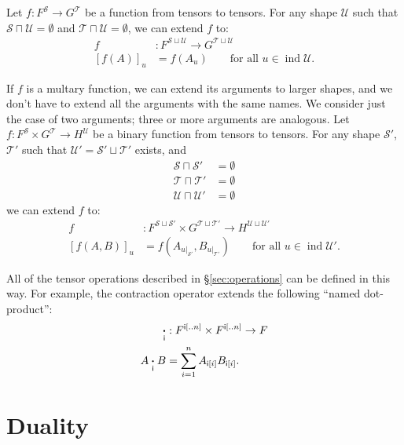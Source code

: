 \documentclass{article}
\DeclareMathOperator{\tupleshape}{ind}
\newcommand{\tuplerestrict}[2]{\left.#1\right|_{#2}}
\begin{document}
Let $f \colon F^{\mathcal{S}} \rightarrow G^{\mathcal{T}}$ be a function from tensors to tensors. For any shape $\mathcal{U}$ such that $\mathcal{S} \sqcap \mathcal{U} = \emptyset$ and $\mathcal{T} \sqcap \mathcal{U} = \emptyset$, we can extend $f$ to:
\begin{align*}
f &: F^{\mathcal{S} \sqcup \mathcal{U}} \rightarrow G^{\mathcal{T} \sqcup \mathcal{U}} \\
[f(A)]_u &= f(A_u) \qquad \text{for all $u \in \tupleshape\mathcal{U}$.}
\end{align*}

If $f$ is a multary function, we can extend its arguments to larger shapes, and we don't have to extend all the arguments with the same names. We consider just the case of two arguments; three or more arguments are analogous. Let $f \colon F^{\mathcal{S}} \times G^{\mathcal{T}} \rightarrow H^{\mathcal{U}}$ be a binary function from tensors to tensors. For any shape $\mathcal{S'}$, $\mathcal{T'}$ such that $\mathcal{U'} = \mathcal{S'} \sqcup \mathcal{T'}$ exists, and 
\begin{align*}
\mathcal{S} \sqcap \mathcal{S'} &= \emptyset \\
\mathcal{T} \sqcap \mathcal{T'} &= \emptyset \\
\mathcal{U} \sqcap \mathcal{U'} &= \emptyset \end{align*}
we can extend $f$ to:
\begin{align*}
f &: F^{\mathcal{S} \sqcup \mathcal{S'}} \times G^{\mathcal{T} \sqcup \mathcal{T'}} \rightarrow H^{\mathcal{U} \sqcup \mathcal{U'}} \\
  [f(A,B)]_u &= f\left(A_{\tuplerestrict{u}{\mathcal{S'}}},B_{\tuplerestrict{u}{\mathcal{T'}}}\right) \qquad \text{for all $u \in \tupleshape\mathcal{U'}$.}
\end{align*}

All of the tensor operations described in \S\ref{sec:operations} can be defined in this way. For example, the contraction operator extends the following ``named dot-product'':
\begin{align*}
\mathbin{\mathop{\boldsymbol\cdot}\limits_{\mathsf{i}}} &: F^{\mathsf{i}[..n]} \times F^{\mathsf{i}[..n]} \rightarrow F \\
A \mathbin{\mathop{\boldsymbol\cdot}\limits_{\mathsf{i}}} B &= \sum_{i=1}^n A_{\mathsf{i}[i]} B_{\mathsf{i}[i]}.
\end{align*}

\section{Duality}
\label{sec:duality}
\end{document}
